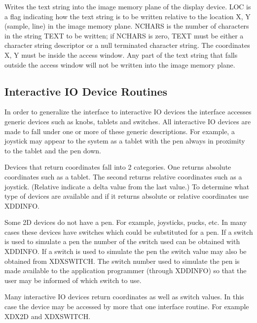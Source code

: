 Writes the text string into the image memory plane of the display
device.  LOC is a flag indicating how the text string is to be
written relative to the location X, Y (sample, line) in the image
memory plane.  NCHARS is the number of characters in the string TEXT
to be written; if NCHARS is zero, TEXT must be either a character
string descriptor or a null terminated character string.  The
coordinates X, Y must be inside the access window.  Any part of
the text string that falls outside the access window will not be
written into the image memory plane.
\newpage
\subsection{Interactive IO Device Routines}
In order to generalize the interface to interactive IO devices the
interface accesses generic devices such as knobs, tablets and
switches.  All interactive IO devices are made to fall under one or
more of these generic descriptions.  For example, a joystick may
appear to the system as a tablet with the pen always in proximity to
the tablet and the pen down.

Devices that return coordinates fall into 2 categories.  One returns
absolute coordinates such as a tablet.  The second returns relative
coordinates such as a joystick.  (Relative indicate a delta value
from the last value.) To determine what type of devices are available
and if it returns absolute or relative coordinates use XDDINFO.

Some 2D devices do not have a pen.  For example, joysticks,
pucks, etc.  In many cases these devices have switches which could be
substituted for a pen.  If a switch is used to simulate a pen the
number of the switch used can be obtained with XDDINFO.
If a switch is used to simulate the pen the switch value may
also be obtained from XDXSWITCH.  The switch number used to simulate
the pen is made available to the application programmer (through
XDDINFO) so that the user may be informed of which switch to use.

Many interactive IO devices return coordinates as well as switch
values.  In this case the device may be accessed by more that one
interface routine.  For example XDX2D and XDXSWITCH.

